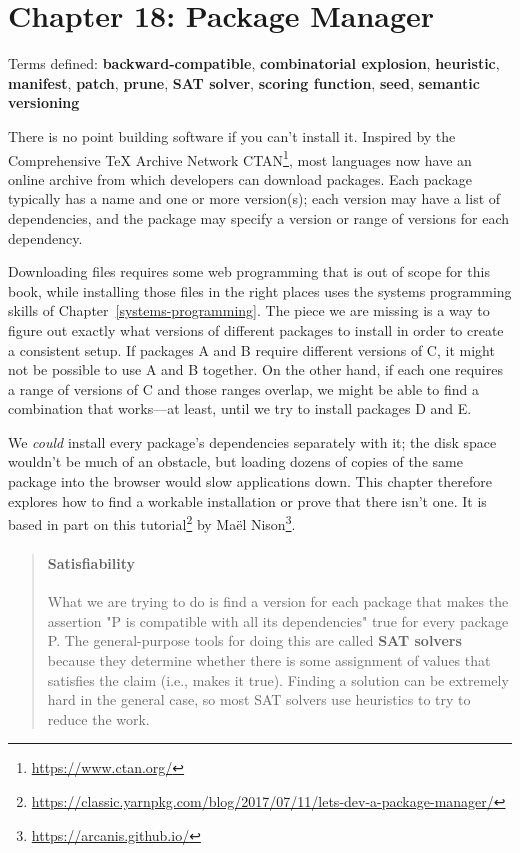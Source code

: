 \documentclass[krantzl]{krantz}
\newcommand{\chapref}[1]{Chapter~\ref{#1}}
\newcommand{\glossref}[1]{\textbf{#1}}
\newenvironment{callout}{\savenotes\begin{tBox}\begin{quotation}\toggletrue{inbox}\renewcommand{\thempfootnote}{\arabic{footnote}}}{\end{quotation}\vspace{\baselineskip}\end{tBox}\togglefalse{inbox}\spewnotes}
\newcommand{\hreffoot}[2]{{#1}\footnote{\href{#2}{#2}}}
\begin{document}
\chapter{Chapter 18: Package Manager}\label{package-manager}


\noindent 
    Terms defined:
    \glossref{backward-compatible}, \glossref{combinatorial explosion}, \glossref{heuristic}, \glossref{manifest}, \glossref{patch}, \glossref{prune}, \glossref{SAT solver}, \glossref{scoring function}, \glossref{seed}, \glossref{semantic versioning}



There is no point building software if you can't install it.
Inspired by the Comprehensive TeX Archive Network \hreffoot{CTAN}{https://www.ctan.org/},
most languages now have an online archive from which developers can download packages.
Each package typically has a name and one or more version(s);
each version may have a list of dependencies,
and the package may specify a version or range of versions for each dependency.


Downloading files requires some web programming that is out of scope for this book,
while installing those files in the right places
uses the systems programming skills of \chapref{systems-programming}.
The piece we are missing is a way to figure out exactly what versions of different packages to install
in order to create a consistent setup.
If packages A and B require different versions of C,
it might not be possible to use A and B together.
On the other hand,
if each one requires a range of versions of C and those ranges overlap,
we might be able to find a combination that works---at least,
until we try to install packages D and E.


We \emph{could} install every package's dependencies separately with it;
the disk space wouldn't be much of an obstacle,
but loading dozens of copies of the same package into the browser
would slow applications down.
This chapter therefore explores how to find a workable installation or prove that there isn't one.
It is based in part on \hreffoot{this tutorial}{https://classic.yarnpkg.com/blog/2017/07/11/lets-dev-a-package-manager/} by \hreffoot{Maël Nison}{https://arcanis.github.io/}.

\begin{callout}


\subsubsection*{Satisfiability}


What we are trying to do is find a version for each package
that makes the assertion "P is compatible with all its dependencies" true
for every package P.
The general-purpose tools for doing this are called \glossref{SAT solvers}
because they determine whether there is some assignment of values
that satisfies the claim (i.e., makes it true).
Finding a solution can be extremely hard in the general case,
so most SAT solvers use heuristics to try to reduce the work.

\end{callout}
\end{document}
